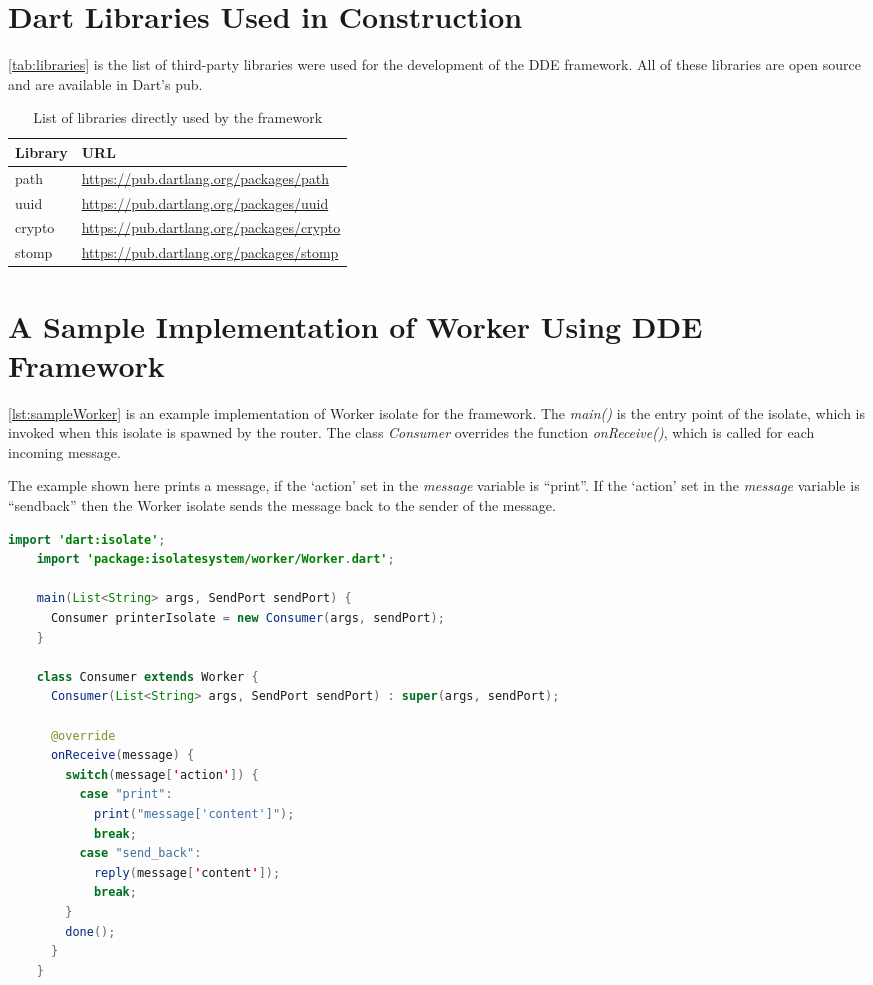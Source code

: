 \section{Dart Libraries Used in Construction}
\autoref{tab:libraries} is the list of third-party libraries were used for the development of the DDE framework. All of these libraries are open source and are available in Dart's pub.

\begin{table}[htsb]
  \caption[Dependent libraries of the framework]{List of libraries directly used by the framework}\label{tab:libraries}
  \centering
  \begin{tabular}{l l}
    \toprule
      Library & URL \\
    \midrule
      path &  \url{https://pub.dartlang.org/packages/path}\\
      uuid &  \url{https://pub.dartlang.org/packages/uuid}\\
      crypto &  \url{https://pub.dartlang.org/packages/crypto}\\
      stomp &  \url{https://pub.dartlang.org/packages/stomp}\\
    \bottomrule
  \end{tabular}
\end{table}

\section{A Sample Implementation of Worker Using DDE Framework}
\autoref{lst:sampleWorker} is an example implementation of Worker isolate for the framework. The \emph{main()} is the entry point of the isolate, which is invoked when this isolate is spawned by the router. The class \emph{Consumer} overrides the function \emph{onReceive()}, which is called for each incoming message.

  The example shown here prints a message, if the ‘action’
 set in the \emph{message} variable is “print”. If the ‘action’ set in the \emph{message} variable is “send\textunderscore{}back” then the Worker isolate sends the message back to the sender of the message.

\begin{lstlisting}[language=java,firstnumber=1, caption=A sample Worker isolate that can be deployed in the framework, label=lst:sampleWorker]
    import 'dart:isolate';
    import 'package:isolatesystem/worker/Worker.dart';

    main(List<String> args, SendPort sendPort) {
      Consumer printerIsolate = new Consumer(args, sendPort);
    }

    class Consumer extends Worker {
      Consumer(List<String> args, SendPort sendPort) : super(args, sendPort);

      @override
      onReceive(message) {
        switch(message['action']) {
          case "print":
            print("message['content']");
            break;
          case "send_back":
            reply(message['content']);
            break;
        }
        done();
      }
    }

\end{lstlisting}
